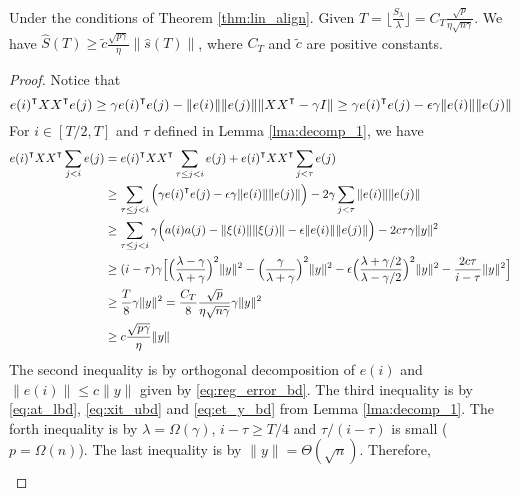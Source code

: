 \begin{lemma}
\label{lma:ST_sT}
Under the conditions of Theorem \ref{thm:lin_align}. Given $T = \lfloor \frac{S_\lambda}{\lambda} \rfloor = C_T\frac{\sqrt{p}}{\eta\sqrt{n\gamma}}$. We have $\hat{S}(T) \geq \tilde{c}\frac{\sqrt {p\gamma}}{\eta}\|\hat{s}(T)\|$, where $C_T$ and $\tilde{c}$ are positive constants.
\end{lemma}
\begin{proof}
Notice that
\begin{equation*}
    e(i)\transpose XX\transpose e(j) \geq \gamma e(i)\transpose e(j) - \|e(i)\|\|e(j)\|\|XX\transpose-\gamma I\| \geq \gamma e(i)\transpose e(j) - \epsilon\gamma\|e(i)\|\|e(j)\|
\end{equation*}
For $i\in[T/2,T]$ and $\tau$ defined in Lemma \ref{lma:decomp_1}, we have
\begin{equation}
\label{eq:eXXe}
\begin{aligned}
    e(i)\transpose XX\transpose \sum_{j<i}e(j) 
    &= e(i)\transpose XX\transpose \sum_{\tau\leq j<i}e(j) + e(i)\transpose XX\transpose \sum_{j<\tau}e(j) \\
    &\geq \sum_{\tau\leq j<i}\Big(\gamma e(i)\transpose e(j) - \epsilon\gamma\|e(i)\|\|e(j)\|\Big) - 2\gamma \sum_{j<\tau}\|e(i)\|\|e(j)\| \\
    &\geq \sum_{\tau\leq j<i}\gamma\Big(a(i)a(j) - \|\xi(i)\|\|\xi(j)\| - \epsilon\|e(i)\|\|e(j)\|\Big) - 2c\tau\gamma \|y\|^2 \\
    &\geq (i-\tau)\gamma\Big[\Big(\frac{\lambda-\gamma}{\lambda+\gamma}\Big)^2\|y\|^2-\Big(\frac{\gamma}{\lambda+\gamma}\Big)^2\|y\|^2-\epsilon\Big(\frac{\lambda+\gamma/2}{\lambda-\gamma/2}\Big)^2\|y\|^2- \frac{2c\tau}{i-\tau}\|y\|^2\Big] \\
    &\geq \frac{T}{8}\gamma\|y\|^2 = \frac{C_T}{8}\frac{\sqrt{p}}{\eta\sqrt{n\gamma}}\gamma\|y\|^2 \\
    &\geq c\frac{\sqrt{p\gamma}}{\eta}\|y\|
\end{aligned}
\end{equation}
The second inequality is by orthogonal decomposition of $e(i)$ and $\|e(i)\|\leq c\|y\|$ given by \eqref{eq:reg_error_bd}. The third inequality is by \eqref{eq:at_lbd}, \eqref{eq:xit_ubd} and \eqref{eq:et_y_bd} from Lemma \ref{lma:decomp_1}. The forth inequality is by $\lambda=\Omega(\gamma)$, $i-\tau \geq T/4$ and $\tau/(i-\tau)$ is small ($p=\Omega(n)$). The last inequality is by $\|y\|=\Theta(\sqrt n)$. Therefore,
\begin{equation*}
\begin{aligned}

\end{aligned}
\end{equation*}
\end{proof}
